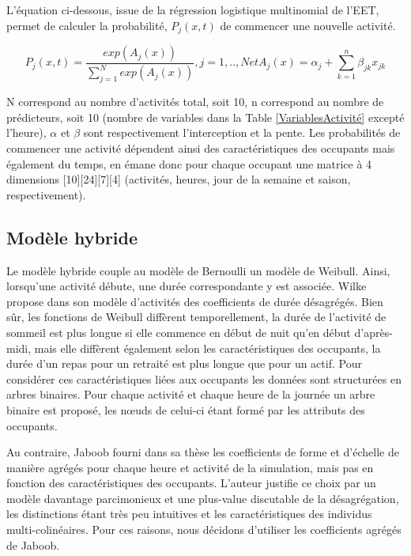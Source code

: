 L'équation ci-dessous, issue de la régression logistique multinomial de l'EET, permet de calculer la probabilité, $P_{j}(x,t)$ de commencer une nouvelle activité.

\begin{equation}
P_{j}(x,t)=\frac{exp(A_{j}(x))}{\sum\limits_{j=1}^{N}exp(A_{j}(x))}, j = 1, .., N et A_{j}(x)= \alpha_{j}+\sum\limits_{k=1}^{n}\beta_{jk}x_{jk}
\end{equation}

N correspond au nombre d'activités total, soit 10, n correspond au nombre de prédicteurs, soit 10 (nombre de variables dans la Table \ref{VariablesActivité} excepté l'heure), $\alpha$ et $\beta$ sont respectivement l'interception et la pente. Les probabilités de commencer une activité dépendent ainsi des caractéristiques des occupants mais également du temps, en émane donc pour chaque occupant une matrice à 4 dimensions [10][24][7][4] (activités, heures, jour de la semaine et saison, respectivement).

\subsection{Modèle hybride}

Le modèle hybride couple au modèle de Bernoulli un modèle de Weibull. Ainsi, lorsqu'une activité débute, une durée correspondante y est associée. Wilke propose dans son modèle d'activités des coefficients de durée désagrégés. Bien sûr, les fonctions de Weibull diffèrent temporellement, la durée de l'activité de sommeil est plus longue si elle commence en début de nuit qu'en début d'après-midi, mais elle diffèrent également selon les caractéristiques des occupants, la durée d'un repas pour un retraité est plus longue que pour un actif. Pour considérer ces caractéristiques liées aux occupants les données sont structurées en arbres binaires. Pour chaque activité et chaque heure de la journée un arbre binaire est proposé, les nœuds de celui-ci étant formé par les attributs des occupants.

Au contraire, Jaboob \cite{Jaboob-16} fourni dans sa thèse les coefficients de forme et d'échelle de manière agrégés pour chaque heure et activité de la simulation, mais pas en fonction des caractéristiques des occupants. L'auteur justifie ce choix par un modèle davantage parcimonieux et une plus-value discutable de la désagrégation, les distinctions étant très peu intuitives et les caractéristiques des individus  multi-colinéaires. Pour ces raisons, nous décidons d'utiliser les coefficients agrégés de Jaboob.

